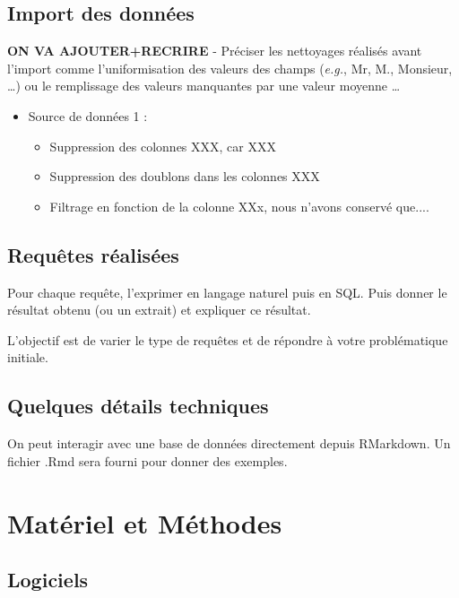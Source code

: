 \documentclass[mstat,12pt]{unswthesis}
\begin{document}
\bigskip

\section{Import des données}\label{import-des-donnuxe9es}

\textbf{ON VA AJOUTER+RECRIRE} \bigskip \newline - Préciser les
nettoyages réalisés avant l'import comme l'uniformisation des valeurs
des champs (\emph{e.g.}, Mr, M., Monsieur, \ldots) ou le remplissage des
valeurs manquantes par une valeur moyenne \ldots{}

\begin{itemize}
    \item  Source de données 1 :
    \begin{itemize} 
     \item Suppression des colonnes XXX, car XXX
     \item  Suppression des doublons dans les colonnes XXX
    \item  Filtrage en fonction de la colonne XXx, nous n'avons conservé que.... 
\end{itemize}
\end{itemize}

\section{Requêtes réalisées}\label{requuxeates-ruxe9alisuxe9es}

Pour chaque requête, l'exprimer en langage naturel puis en SQL. Puis
donner le résultat obtenu (ou un extrait) et expliquer ce résultat.

L'objectif est de varier le type de requêtes et de répondre à votre
problématique initiale.

\section{Quelques détails
techniques}\label{quelques-duxe9tails-techniques}

On peut interagir avec une base de données directement depuis RMarkdown.
Un fichier .Rmd sera fourni pour donner des exemples.

\chapter{Matériel et Méthodes}\label{matuxe9riel-et-muxe9thodes}

\section{Logiciels}\label{logiciels}
\end{document}
